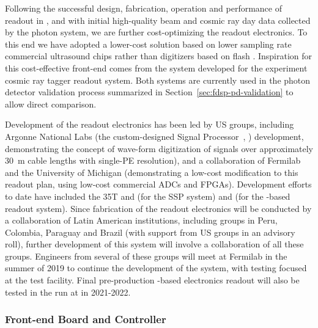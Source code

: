 Following the successful design, fabrication, operation and performance of  readout in , and with initial high-quality beam and cosmic ray day data collected by the  photon system, we are
further cost-optimizing the readout electronics.  To this end we have adopted a lower-cost solution based on lower sampling rate commercial ultrasound  chips rather than digitizers based on flash . Inspiration for this cost-effective front-end comes from the system developed for the  experiment cosmic ray tagger readout system.
Both systems are currently used in the photon detector validation process summarized in Section~\ref{sec:fdsp-pd-validation} to allow direct comparison.


Development of the readout electronics has been led by US groups, including Argonne National Labs (the custom-designed  Signal Processor~, ) development, demonstrating the concept of wave-form digitization of  signals over approximately \SI{30}{m} cable lengths with single-PE resolution), and a collaboration of Fermilab and the University of Michigan (demonstrating a low-cost modification to this readout plan, using low-cost commercial ADCs and FPGAs).  Development efforts to date have included the 35T and  (for the SSP system) and  (for the -based readout system).  Since fabrication of the readout electronics will be conducted by a collaboration of Latin American institutions, including groups in Peru, Colombia, Paraguay and Brazil (with support from US groups in an advisory roll), further development of this system will involve a collaboration of all these groups.  Engineers from several of these groups will meet at Fermilab in the summer of 2019 to continue the development of the system, with testing focused at the  test facility.  Final pre-production -based electronics readout will also be tested in the  run at  in 2021-2022.

\subsubsection{Front-end Board and Controller}


